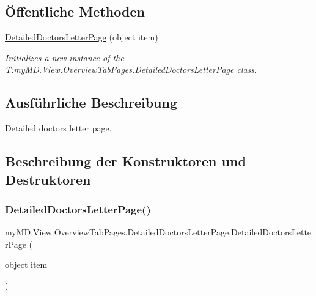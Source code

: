 \subsection*{Öffentliche Methoden}
\begin{DoxyCompactItemize}
\item 
\mbox{\hyperlink{classmy_m_d_1_1_view_1_1_overview_tab_pages_1_1_detailed_doctors_letter_page_a28245631ccc5cb7fc5e5ced0bc4d7731}{Detailed\+Doctors\+Letter\+Page}} (object item)
\begin{DoxyCompactList}\small\item\em Initializes a new instance of the T\+:my\+M\+D.\+View.\+Overview\+Tab\+Pages.\+Detailed\+Doctors\+Letter\+Page class. \end{DoxyCompactList}\end{DoxyCompactItemize}


\subsection{Ausführliche Beschreibung}
Detailed doctors letter page. 



\subsection{Beschreibung der Konstruktoren und Destruktoren}
\mbox{\label{classmy_m_d_1_1_view_1_1_overview_tab_pages_1_1_detailed_doctors_letter_page_a28245631ccc5cb7fc5e5ced0bc4d7731}} 
\subsubsection{\texorpdfstring{Detailed\+Doctors\+Letter\+Page()}{DetailedDoctorsLetterPage()}}
{\footnotesize\ttfamily my\+M\+D.\+View.\+Overview\+Tab\+Pages.\+Detailed\+Doctors\+Letter\+Page.\+Detailed\+Doctors\+Letter\+Page (\begin{DoxyParamCaption}\item[{object}]{item }\end{DoxyParamCaption})}



